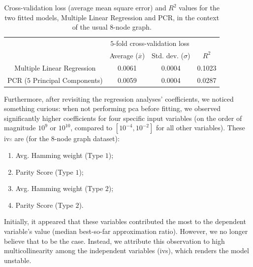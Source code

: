 \begin{table}[H]
  \centering
  \begin{tabular}{|c|cc|c|}
  \hline
  \rowcolor[HTML]{FFFFFF} 
  \cellcolor[HTML]{FFFFFF}                               & \multicolumn{2}{c|}{\cellcolor[HTML]{FFFFFF}$5$-fold cross-validation loss} & \cellcolor[HTML]{FFFFFF} \\ \cline{2-3}
  \rowcolor[HTML]{FFFFFF} 
  \multirow{-2}{*}{\cellcolor[HTML]{FFFFFF}Model ($8$-node graph)} &
    \multicolumn{1}{c|}{\cellcolor[HTML]{FFFFFF}Average ($\overline{x}$)} &
    Std. dev. ($\sigma$) &
    \multirow{-2}{*}{\cellcolor[HTML]{FFFFFF}$R^2$} \\ \hline
  \rowcolor[HTML]{EFEFEF} 
  \cellcolor[HTML]{FFFFFF}Multiple Linear Regression     & \multicolumn{1}{c|}{\cellcolor[HTML]{EFEFEF}0.0061}         & 0.0004        & 0.1023                   \\ \hline
  \rowcolor[HTML]{EFEFEF} 
  \cellcolor[HTML]{FFFFFF}PCR ($5$ Principal Components) & \multicolumn{1}{c|}{\cellcolor[HTML]{EFEFEF}0.0059}         & 0.0004        & 0.0287                   \\ \hline
  \end{tabular}
  \caption{Cross-validation loss (average mean square error) and $R^2$ values for the two fitted models, Multiple Linear Regression and PCR, in the context of the usual $8$-node graph.}
  \label{tab:Scaled_Median_BSF_Table_8-node}
\end{table}

Furthermore, after revisiting the regression analyses' coefficients, we noticed something curious: when not performing \acrshort{pca} before fitting, we observed significantly higher coefficients for four specific input variables (on the order of magnitude \(10^9\) or \(10^{10}\), compared to \([10^{-4}, 10^{-2}]\) for all other variables). These \acrshort{iv}\textcolor{gray}{s} are (for the $8$-node graph dataset):
\begin{enumerate}
    \item Avg. Hamming weight (Type $1$);
    \item Parity Score (Type $1$);
    \item Avg. Hamming weight (Type $2$);
    \item Parity Score (Type $2$).
\end{enumerate}
Initially, it appeared that these variables contributed the most to the dependent variable's value (median best-so-far approximation ratio). However, we no longer believe that to be the case. Instead, we attribute this observation to high multicollinearity among the independent variables (\acrshort{iv}{s}), which renders the model unstable.

